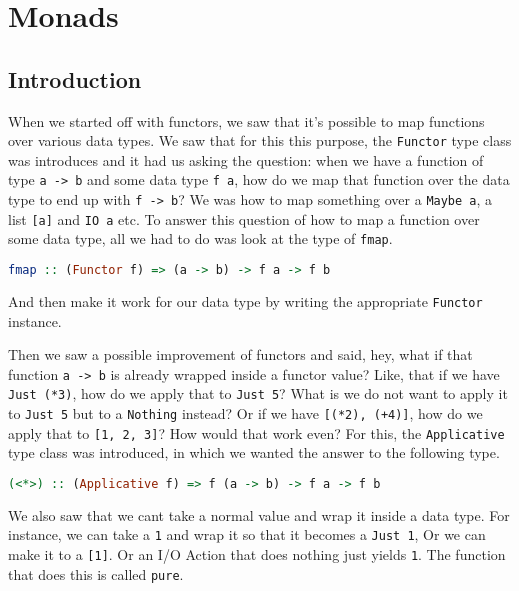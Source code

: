 \newpage
\chapter{Monads}
\section{Introduction}
When we started off with functors, we saw that it's possible to map functions over various data types. We saw that for this this purpose, the \texttt{Functor} type class was introduces and it had us asking the question: when we have a function of type \texttt{a -> b} and some data type \texttt{f a}, how do we map that function over the data type to end up with \texttt{f -> b}? We was how to map something over a \texttt{Maybe a}, a list \texttt{[a]} and \texttt{IO a} etc. To answer this question of how to map a function over some data type, all we had to do was look at the type of \texttt{fmap}.

\begin{lstlisting}[language=haskell]
fmap :: (Functor f) => (a -> b) -> f a -> f b
\end{lstlisting}

And then make it work for our data type by writing the appropriate \texttt{Functor} instance.
\linebreak \linebreak

Then we saw a possible improvement of functors and said, hey, what if that function \texttt{a -> b} is already wrapped inside a functor value? Like, that if we have \texttt{Just (*3)}, how do we apply that to \texttt{Just 5}? What is we do not want to apply it to \texttt{Just 5} but to a \texttt{Nothing} instead? Or if we have \texttt{[(*2), (+4)]}, how do we apply that to \texttt{[1, 2, 3]}? How would that work even? For this, the \texttt{Applicative} type class was introduced, in which we wanted the answer to the following type.

\begin{lstlisting}[language=haskell]
(<*>) :: (Applicative f) => f (a -> b) -> f a -> f b
\end{lstlisting}

We also saw that we cant take a normal value and wrap it inside a data type. For instance, we can take a \texttt{1} and wrap it so that it becomes a \texttt{Just 1}, Or we can make it to a \texttt{[1]}. Or an I/O Action that does nothing just yields \texttt{1}. The function that does this is called \texttt{pure}.
\linebreak \linebreak

